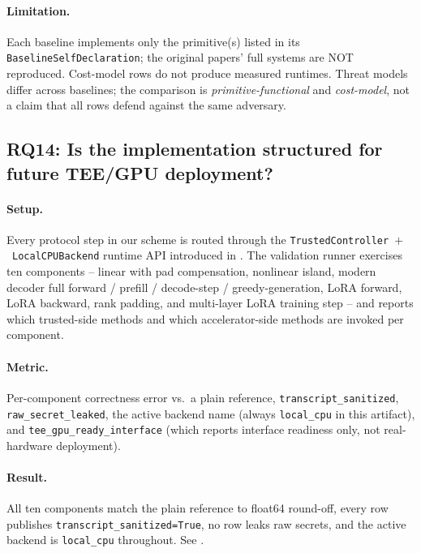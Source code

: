 \paragraph{Limitation.} Each baseline implements only the primitive(s) listed in its \texttt{BaselineSelfDeclaration}; the original papers' full systems are NOT reproduced. Cost-model rows do not produce measured runtimes. Threat models differ across baselines; the comparison is \emph{primitive-functional} and \emph{cost-model}, not a claim that all rows defend against the same adversary.



\subsection{RQ14: Is the implementation structured for future TEE/GPU deployment?}
\label{sec:eval:rq14}
\paragraph{Setup.} Every protocol step in our scheme is routed through the \texttt{TrustedController}~$+$~\texttt{LocalCPUBackend} runtime API introduced in . The validation runner exercises ten components -- linear with pad compensation, nonlinear island, modern decoder full forward / prefill / decode-step / greedy-generation, LoRA forward, LoRA backward, rank padding, and multi-layer LoRA training step -- and reports which trusted-side methods and which accelerator-side methods are invoked per component.

\paragraph{Metric.} Per-component correctness error vs.\ a plain reference, \texttt{transcript\_sanitized}, \texttt{raw\_secret\_leaked}, the active backend name (always \texttt{local\_cpu} in this artifact), and \texttt{tee\_gpu\_ready\_interface} (which reports interface readiness only, not real-hardware deployment).

\paragraph{Result.} All ten components match the plain reference to float64 round-off, every row publishes \texttt{transcript\_sanitized=True}, no row leaks raw secrets, and the active backend is \texttt{local\_cpu} throughout. See .

